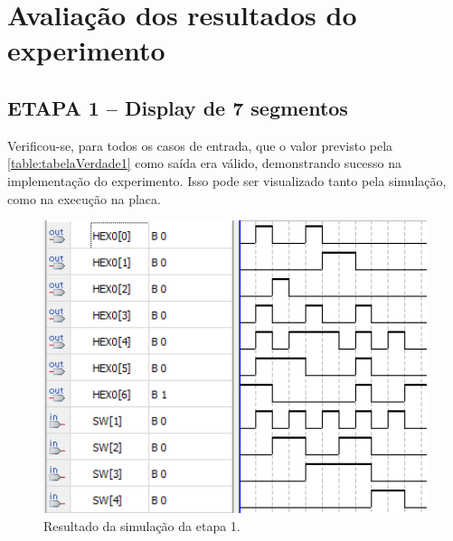 \chapter{Avaliação dos resultados do experimento}
	\section{ETAPA 1 – Display de 7 segmentos}

		Verificou-se, para todos os casos de entrada, que o valor previsto pela \autoref{table:tabelaVerdade1}
		como saída era válido, demonstrando sucesso na implementação do experimento. Isso pode
		ser visualizado tanto pela simulação, como na execução na placa.

		\begin{figure}[H]
		    \centering
			\caption{\label{fig:etapa1Simulacao}Resultado da simulação da etapa 1.}
			\includegraphics[width=1\textwidth]{img/etapa1/SimulacaoSegmentos7}
		\end{figure}

